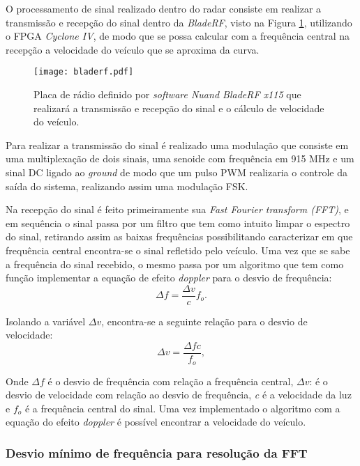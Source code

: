 O processamento de sinal realizado dentro do radar consiste em realizar a transmissão e recepção do sinal dentro da \emph{BladeRF}, visto na Figura \ref{bladerf}, utilizando o FPGA \emph{Cyclone IV}, de modo que se possa calcular com a frequência central na recepção a velocidade do veículo que se aproxima da curva. 

\begin{figure}[H]
    \centering
   \texttt{[image: bladerf.pdf]}
   \caption{Placa de rádio definido por \emph{software Nuand BladeRF x115} que realizará a transmissão e recepção do sinal e o cálculo de velocidade do veículo.}
   \label{bladerf}
    \end{figure}

Para realizar a transmissão do sinal é realizado uma modulação que consiste em uma multiplexação de dois sinais, uma senoide com frequência em 915 MHz e um sinal DC ligado ao \emph{ground} de modo que um pulso PWM realizaria o controle da saída do sistema, realizando assim uma modulação FSK.

Na recepção do sinal é feito primeiramente sua \emph{Fast Fourier transform (FFT)}, e em sequência o sinal passa por um filtro que tem como intuito limpar o espectro do sinal, retirando assim as baixas frequências possibilitando caracterizar em que frequência central encontra-se o sinal refletido pelo veículo. Uma vez que se sabe a frequência do sinal recebido, o mesmo passa por um algoritmo que tem como função implementar a equação de efeito \emph{doppler} para o desvio de frequência:
\begin{equation}\label{freq_desv}
  \Delta f = \frac{\Delta v}{c}f_o.
\end{equation}

Isolando a variável $\Delta v$, encontra-se a seguinte relação para o desvio de velocidade:
\begin{equation}\label{vel}
  \Delta v = \frac{\Delta f c}{f_o},
\end{equation}

Onde $\Delta f$ é o desvio de frequência com relação a frequência central, $\Delta v$: é o desvio de velocidade com relação ao desvio de frequência, \emph{c} é a velocidade da luz e $f_o$ é a frequência central do sinal. Uma vez implementado o algoritmo com a equação do efeito \emph{doppler} é possível encontrar a velocidade do veículo.

\subsubsection{Desvio mínimo de frequência para resolução da FFT}

